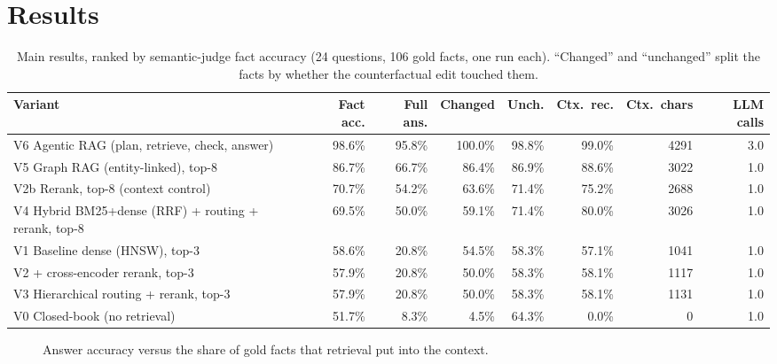 \documentclass[11pt,a4paper]{article}
\begin{document}
\section{Results}
\begin{table}[h]\centering\footnotesize\setlength{\tabcolsep}{3.5pt}
\caption{Main results, ranked by semantic-judge fact accuracy (24 questions, 106 gold facts, one run each). ``Changed'' and ``unchanged'' split the facts by whether the counterfactual edit touched them.}
\begin{tabular}{@{}p{4.9cm}rrrrrrr@{}}\toprule
Variant & Fact acc. & Full ans. & Changed & Unch. & Ctx.\ rec. & Ctx.\ chars & LLM calls\\\midrule
V6 Agentic RAG (plan, retrieve, check, answer) & 98.6\% & 95.8\% & 100.0\% & 98.8\% & 99.0\% & 4291 & 3.0 \\
V5 Graph RAG (entity-linked), top-8 & 86.7\% & 66.7\% & 86.4\% & 86.9\% & 88.6\% & 3022 & 1.0 \\
V2b Rerank, top-8 (context control) & 70.7\% & 54.2\% & 63.6\% & 71.4\% & 75.2\% & 2688 & 1.0 \\
V4 Hybrid BM25+dense (RRF) + routing + rerank, top-8 & 69.5\% & 50.0\% & 59.1\% & 71.4\% & 80.0\% & 3026 & 1.0 \\
V1 Baseline dense (HNSW), top-3 & 58.6\% & 20.8\% & 54.5\% & 58.3\% & 57.1\% & 1041 & 1.0 \\
V2 + cross-encoder rerank, top-3 & 57.9\% & 20.8\% & 50.0\% & 58.3\% & 58.1\% & 1117 & 1.0 \\
V3 Hierarchical routing + rerank, top-3 & 57.9\% & 20.8\% & 50.0\% & 58.3\% & 58.1\% & 1131 & 1.0 \\
V0 Closed-book (no retrieval) & 51.7\% & 8.3\% & 4.5\% & 64.3\% & 0.0\% & 0 & 1.0 \\
\bottomrule\end{tabular}
\end{table}

\begin{figure}[h]\centering
{}
\caption{Answer accuracy versus the share of gold facts that retrieval put into the context.}
\end{figure}
\end{document}
